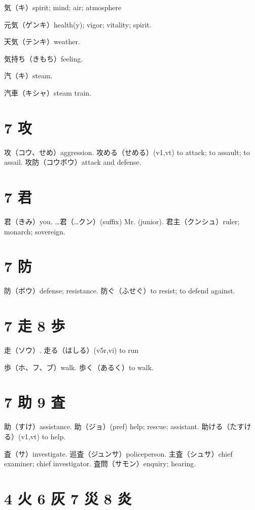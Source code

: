 気（キ）spirit; mind; air; atmosphere

元気（ゲンキ）health(y); vigor; vitality; spirit.

天気（テンキ）weather.

気持ち（きもち）feeling.

汽（キ）steam.

汽車（キシャ）steam train.

\section{7 攻}

攻（コウ、せめ）aggression.
攻める（せめる）(v1,vt) to attack; to assault; to assail.
攻防（コウボウ）attack and defense.

\section{7 君}

君（きみ）you.
…君（…クン）(suffix) Mr. (junior).
君主（クンシュ）ruler; monarch; sovereign.

\section{7 防}

防（ボウ）defense; resistance.
防ぐ（ふせぐ）to resist; to defend against.

\section{7 走 8 歩}

走（ソウ）.
走る（はしる）(v5r,vi) to run

歩（ホ、フ、ブ）walk.
歩く（あるく）to walk.

\section{7 助 9 査}

助（すけ）assistance.
助（ジョ）(pref) help; rescue; assistant.
助ける（たすける）(v1,vt) to help.

査（サ）investigate.
巡査（ジュンサ）policeperson.
主査（シュサ）chief examiner; chief investigator.
査問（サモン）enquiry; hearing.

\section{4 火 6 灰 7 災 8 炎}

